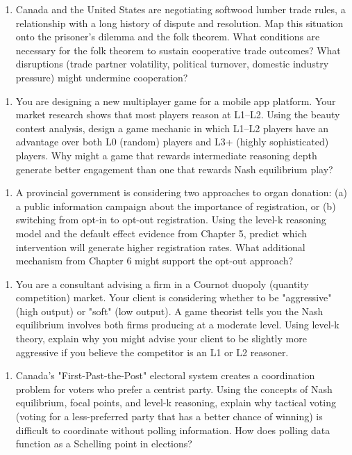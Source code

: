 \documentclass[12pt, letterpaper]{article}
\begin{document}
\begin{enumerate}
\item Canada and the United States are negotiating softwood lumber trade rules, a relationship with a long history of dispute and resolution. Map this situation onto the prisoner's dilemma and the folk theorem. What conditions are necessary for the folk theorem to sustain cooperative trade outcomes? What disruptions (trade partner volatility, political turnover, domestic industry pressure) might undermine cooperation?
\end{enumerate}

\begin{enumerate}
\item You are designing a new multiplayer game for a mobile app platform. Your market research shows that most players reason at L1--L2. Using the beauty contest analysis, design a game mechanic in which L1--L2 players have an advantage over both L0 (random) players and L3+ (highly sophisticated) players. Why might a game that rewards intermediate reasoning depth generate better engagement than one that rewards Nash equilibrium play?
\end{enumerate}

\begin{enumerate}
\item A provincial government is considering two approaches to organ donation: (a) a public information campaign about the importance of registration, or (b) switching from opt-in to opt-out registration. Using the level-k reasoning model and the default effect evidence from Chapter 5, predict which intervention will generate higher registration rates. What additional mechanism from Chapter 6 might support the opt-out approach?
\end{enumerate}

\begin{enumerate}
\item You are a consultant advising a firm in a Cournot duopoly (quantity competition) market. Your client is considering whether to be "aggressive" (high output) or "soft" (low output). A game theorist tells you the Nash equilibrium involves both firms producing at a moderate level. Using level-k theory, explain why you might advise your client to be slightly more aggressive if you believe the competitor is an L1 or L2 reasoner.
\end{enumerate}

\begin{enumerate}
\item Canada's "First-Past-the-Post" electoral system creates a coordination problem for voters who prefer a centrist party. Using the concepts of Nash equilibrium, focal points, and level-k reasoning, explain why tactical voting (voting for a less-preferred party that has a better chance of winning) is difficult to coordinate without polling information. How does polling data function as a Schelling point in elections?
\end{enumerate}
\end{document}
